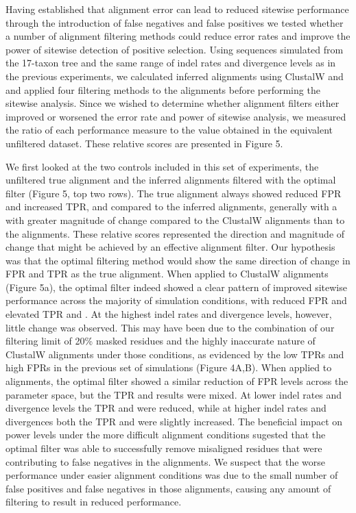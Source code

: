 \documentclass{mbe}
\begin{document}
Having established that alignment error can lead to reduced sitewise
performance through the introduction of false negatives and false
positives we tested whether a number of alignment filtering methods
could reduce error rates and improve the power of sitewise detection
of positive selection. Using sequences simulated from the 17-taxon
tree and the same range of indel rates and divergence levels as in the
previous experiments, we calculated inferred alignments using ClustalW
and \prankc{} and applied four filtering methods to the alignments
before performing the sitewise analysis. Since we wished to determine
whether alignment filters either improved or worsened the error rate
and power of sitewise analysis, we measured the ratio of each
performance measure to the value obtained in the equivalent unfiltered
dataset. These relative scores are presented in Figure 5.

We first looked at the two controls included in this set of
experiments, the unfiltered true alignment and the inferred alignments
filtered with the optimal filter (Figure 5, top two rows). The true
alignment always showed reduced FPR and increased TPR, and \tpr{}
compared to the inferred alignments, generally with a with greater
magnitude of change compared to the ClustalW alignments than to the
\prankc{} alignments. These relative scores represented the direction
and magnitude of change that might be achieved by an effective
alignment filter. Our hypothesis was that the optimal filtering method
would show the same direction of change in FPR and TPR as the true
alignment. When applied to ClustalW alignments (Figure 5a), the
optimal filter indeed showed a clear pattern of improved sitewise
performance across the majority of simulation conditions, with reduced
FPR and elevated TPR and \tpr{}. At the highest indel rates and
divergence levels, however, little change was observed. This may have
been due to the combination of our filtering limit of 20\% masked
residues and the highly inaccurate nature of ClustalW alignments under
those conditions, as evidenced by the low TPRs and high FPRs in the
previous set of simulations (Figure 4A,B). When applied to \prankc{}
alignments, the optimal filter showed a similar reduction of FPR
levels across the parameter space, but the TPR and \tpr{} results were
mixed. At lower indel rates and divergence levels the TPR and \tpr{}
were reduced, while at higher indel rates and divergences both the TPR
and \tpr{} were slightly increased. The beneficial impact on power
levels under the more difficult alignment conditions sugested that the
optimal filter was able to successfully remove misaligned residues
that were contributing to false negatives in the \prankc{}
alignments. We suspect that the worse performance under easier
alignment conditions was due to the small number of false positives
and false negatives in those \prankc{} alignments, causing any amount
of filtering to result in reduced performance.
\end{document}
